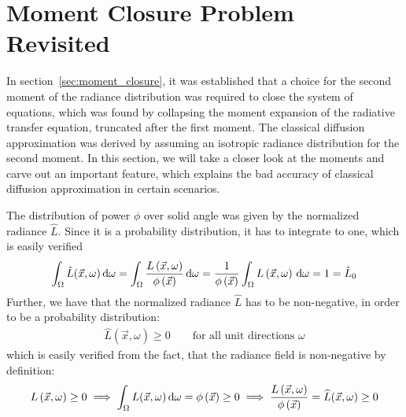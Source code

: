 \section{Moment Closure Problem Revisited}
\label{sec:moment_problem_revisited}

In section~\ref{sec:moment_closure}, it was established that a choice for the second moment of the radiance distribution was required to close the system of equations, which was found by collapsing the moment expansion of the radiative transfer equation, truncated after the first moment. The classical diffusion approximation was derived by assuming an isotropic radiance distribution for the second moment. In this section, we will take a closer look at the moments and carve out an important feature, which explains the bad accuracy of classical diffusion approximation in certain scenarios.

The distribution of power $\phi$ over solid angle was given by the normalized radiance $\widehat{L}$. Since it is a probability distribution, it has to integrate to one, which is easily verified
\begin{align*}
\int_{\Omega}{\hat{L}(\vec{x}, \omega)\,\mathrm{d}\omega}=
\int_{\Omega}{\frac{L\left(\vec{x}, \omega\right)}{\phi\left(\vec{x}\right)}\,\mathrm{d}\omega}=
\frac{1}{\phi\left(\vec{x}\right)}
\int_{\Omega}{L\left(\vec{x}, \omega\right)\,\mathrm{d}\omega}
=1
=\hat{L}_0
\end{align*}
Further, we have that the normalized radiance $\widehat{L}$ has to be non-negative, in order to be a probability distribution:
\begin{align*}
\hat{L}(\vec{x}, \omega)\ge 0 \qquad \text{for all unit directions } \omega
\end{align*}
which is easily verified from the fact, that the radiance field is non-negative by definition:
\begin{align*}
L\left(\vec{x}, \omega\right) \ge 0
\implies
\int_{\Omega}{L(\vec{x}, \omega)\,\mathrm{d}\omega}=\phi\left(\vec{x}\right)\ge 0
\implies
\frac{L\left(\vec{x}, \omega\right)}{\phi\left(\vec{x}\right)}=\widehat{L}(\vec{x}, \omega) \ge 0
\end{align*}

